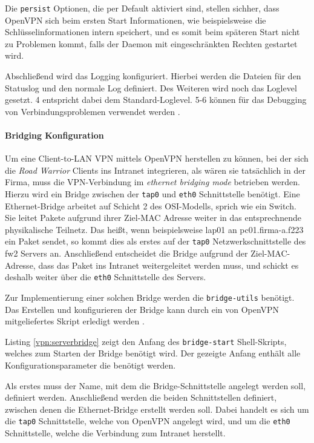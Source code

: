 Die \texttt{persist} Optionen, die per Default aktiviert sind, stellen sichher, dass OpenVPN sich beim ersten Start Informationen, wie beispielsweise die Schlüsselinformationen intern speichert, und es somit beim späteren Start nicht zu Problemen kommt, falls der Daemon mit eingeschränkten Rechten gestartet wird.

Abschließend wird das Logging konfiguriert. Hierbei werden die Dateien für den Statuslog und den normale Log definiert. Des Weiteren wird noch das Loglevel gesetzt. 4 entspricht dabei dem Standard-Loglevel. 5-6 können für das Debugging von Verbindungsproblemen verwendet werden \cite{OpenVPN}.

\paragraph{Bridging Konfiguration}

Um eine Client-to-LAN VPN mittels OpenVPN herstellen zu können, bei der sich die \emph{Road Warrior} Clients ins Intranet integrieren, als wären sie tatsächlich in der Firma, muss die VPN-Verbindung im \emph{ethernet bridging mode} betrieben werden. Hierzu wird ein Bridge zwischen der \texttt{tap0} und \texttt{eth0} Schnittstelle benötigt. Eine Ethernet-Bridge arbeitet auf Schicht 2 des OSI-Modells, sprich wie ein Switch. Sie leitet Pakete aufgrund ihrer Ziel-MAC Adresse weiter in das entsprechnende physikalische Teilnetz. Das heißt, wenn beispielsweise lap01 an pc01.firma-a.f223 ein Paket sendet, so kommt dies als erstes auf der \texttt{tap0} Netzwerkschnittstelle des fw2 Servers an. Anschließend entscheidet die Bridge aufgrund der Ziel-MAC-Adresse, dass das Paket ins Intranet weitergeleitet werden muss, und schickt es deshalb weiter über die \texttt{eth0} Schnittstelle des Servers.

Zur Implementierung einer solchen Bridge werden die \texttt{bridge-utils} benötigt. Das Erstellen und konfigurieren der Bridge kann durch ein von OpenVPN mitgeliefertes Skript erledigt werden \cite{OpenVPN}.



Listing \ref{vpn:serverbridge} zeigt den Anfang des \texttt{bridge-start} Shell-Skripts, welches zum Starten der Bridge benötigt wird. Der gezeigte Anfang enthält alle Konfigurationsparameter die benötigt werden.

Als erstes muss der Name, mit dem die Bridge-Schnittstelle angelegt werden soll, definiert werden. Anschließend werden die beiden Schnittstellen definiert, zwischen denen die Ethernet-Bridge erstellt werden soll. Dabei handelt es sich um die \texttt{tap0} Schnittstelle, welche von OpenVPN angelegt wird, und um die \texttt{eth0} Schnittstelle, welche die Verbindung zum Intranet herstellt.

